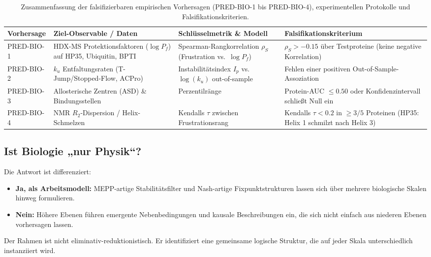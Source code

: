 \documentclass[12pt,a4paper]{article}
\theoremstyle{remark}
\begin{document}
\begin{table}[htbp]
\centering
\caption{Zusammenfassung der falsifizierbaren empirischen Vorhersagen (PRED-BIO-1 bis PRED-BIO-4), experimentellen Protokolle und Falsifikationskriterien.}
\label{tab:pred-bio-summary}
\small
\begin{tabularx}{\textwidth}{@{}L{0.16\textwidth} L{0.24\textwidth} L{0.24\textwidth} Y@{}}
\toprule
\textbf{Vorhersage} & \textbf{Ziel-Observable / Daten} & \textbf{Schlüsselmetrik \& Modell} & \textbf{Falsifikationskriterium} \\
\midrule
PRED-BIO-1 & HDX-MS Protektionsfaktoren ($\log P_f$) auf HP35, Ubiquitin, BPTI & Spearman-Rangkorrelation $\rho_S$ (Frustration vs.\ $\log P_f$) & $\rho_S > -0.15$ über Testproteine (keine negative Korrelation) \\
PRED-BIO-2 & $k_u$ Entfaltungsraten (T-Jump/Stopped-Flow, ACPro) & Instabilitätsindex $I_p$ vs.\ $\log(k_u)$ out-of-sample & Fehlen einer positiven Out-of-Sample-Assoziation \\
PRED-BIO-3 & Allosterische Zentren (ASD) \& Bindungsstellen & Perzentilränge & Protein-AUC $\le 0.50$ oder Konfidenzintervall schließt Null ein \\
PRED-BIO-4 & NMR $R_2$-Dispersion / Helix-Schmelzen & Kendalls $\tau$ zwischen Frustrationsrang & Kendalls $\tau < 0.2$ in $\ge 3/5$ Proteinen (HP35: Helix 1 schmilzt nach Helix 3) \\
\bottomrule
\end{tabularx}
\end{table}

\subsection{Ist Biologie „nur Physik“?}

Die Antwort ist differenziert:
\begin{itemize}
    \item \textbf{Ja, als Arbeitsmodell:} MEPP-artige Stabilitätsfilter und Nash-artige Fixpunktstrukturen lassen sich über mehrere biologische Skalen hinweg formulieren.
    \item \textbf{Nein:} Höhere Ebenen führen emergente Nebenbedingungen und kausale Beschreibungen ein, die sich nicht einfach aus niederen Ebenen vorhersagen lassen.
\end{itemize}

Der Rahmen ist nicht eliminativ-reduktionistisch. Er identifiziert eine gemeinsame logische Struktur, die auf jeder Skala unterschiedlich instanziiert wird.
\end{document}
